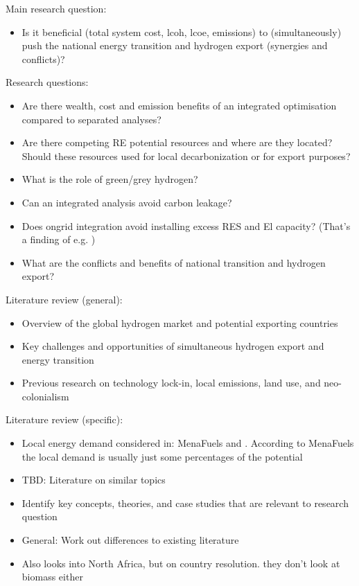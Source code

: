 Main research question:
\begin{itemize}
    \item Is it beneficial (total system cost, lcoh, lcoe, emissions) to (simultaneously) push the national energy transition and hydrogen export (synergies and conflicts)?   
\end{itemize}

Research questions:
\begin{itemize}
    \item Are there wealth, cost and emission benefits of an integrated optimisation compared to separated analyses?
    \item Are there competing RE potential resources and where are they located? Should these resources used for local decarbonization or for export purposes?
    \item What is the role of green/grey hydrogen?   
    \item Can an integrated analysis avoid carbon leakage?
    \item Does ongrid integration avoid installing excess RES and El capacity? (That's a finding of e.g. \cite{Ruhnau2022})
    \item What are the conflicts and benefits of national transition and hydrogen export?
\end{itemize}

Literature review (general):
\begin{itemize}
    \item Overview of the global hydrogen market and potential exporting countries
    \item Key challenges and opportunities of simultaneous hydrogen export and energy transition
    \item Previous research on technology lock-in, local emissions, land use, and neo-colonialism
\end{itemize}

Literature review (specific):
\begin{itemize}
    \item Local energy demand considered in: MenaFuels and \cite{Hampp2021}. According to MenaFuels the local demand is usually just some percentages of the potential
    \item TBD: Literature on similar topics 
    \item Identify key concepts, theories, and case studies that are relevant to research question
    \item General: Work out differences to existing literature
    \item \cite{Zwaan2021} Also looks into North Africa, but on country resolution. they don't look at biomass either
\end{itemize}


